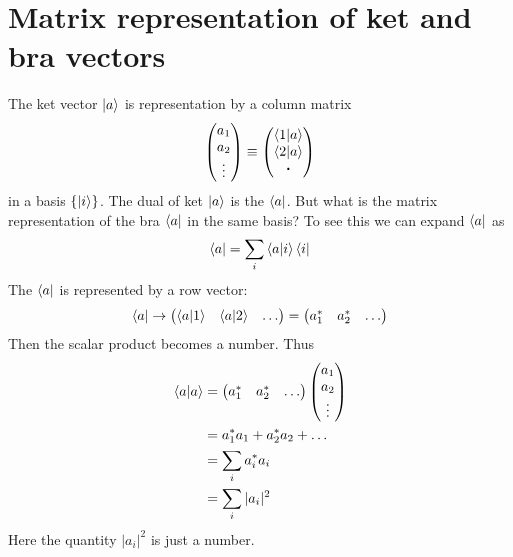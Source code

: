 \section{Matrix representation of ket and bra vectors}
The ket vector $\ket{a}$ is representation by a column matrix
\begin{equation}\label{eqn3.51}
\left(
\begin{matrix}
a_1 \\ a_2 \\ \vdots
\end{matrix}
\right) \equiv \left(
\begin{matrix}
\braket{1}{a} \\ \braket{2}{a} \\ \vdot
\end{matrix}
\right)
\end{equation}
in a basis $\{\ket{i} \}$. The dual of ket $\ket{a}$ is the $\bra{a}$. But what is the matrix  representation of the bra $\bra{a}$ in the same basis? To see this we can expand $\bra{a}$ as
\begin{equation}\label{eqn3.52}
\bra{a} = \sum_{i} \braket{a}{i}\bra{i}
\end{equation}
The $\bra{a}$ is represented by a row vector:
\begin{equation}\label{eqn3.53}
\bra{a} \rightarrow \left(
\begin{matrix}
\braket{a}{1} & \braket{a}{2} & \ldots
\end{matrix}
\right) = \left(
\begin{matrix}
a_1^* & a_2^* & \ldots
\end{matrix}
\right)
\end{equation}
Then the scalar product becomes a number. Thus
\begin{align}\label{eqn3.54-3.57}
	\braket{a}{a} &= \left(
	\begin{matrix}
		a_1^* & a_2^* & \ldots
	\end{matrix}
	\right) \left(
	\begin{matrix}
		a_1 \\ a_2 \\ \vdots
	\end{matrix}
	\right)\\
	&= a_1^* a_1 + a_2^* a_2 + \ldots \\
	&= \sum_{i} a_i^* a_i \\
	&= \sum_{i} |a_i|^2 
\end{align}
Here the quantity $|a_i|^2$ is just a number.\\
